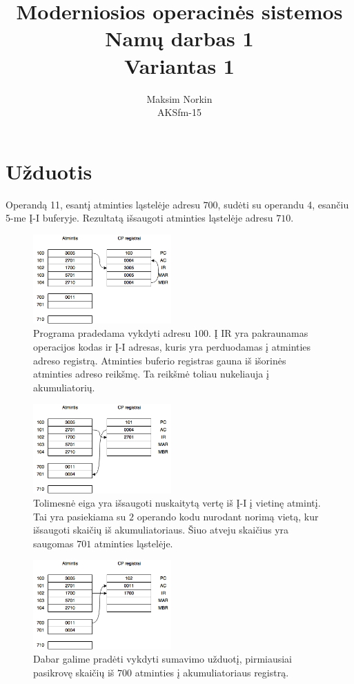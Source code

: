 \documentclass[11pt,a4paper]{article}
\title{Moderniosios operacinės sistemos\\Namų darbas 1\\Variantas 1}
\author{Maksim Norkin\\ AKSfm-15}
\begin{document}
    \maketitle

    \section{Užduotis}

    Operandą 11, esantį atminties ląstelėje adresu $700$, sudėti su operandu 4, esančiu 5-me Į-I buferyje. Rezultatą išsaugoti atminties ląstelėje adresu $710$.

    \begin{figure}[H]
        \centering
        \includegraphics[width=200px]{img/operacines-sistemos-01.png}
        \caption{Programa pradedama vykdyti adresu $100$. Į IR yra pakraunamas operacijos kodas ir Į-I adresas, kuris yra perduodamas į atminties adreso registrą. Atminties buferio registras gauna iš išorinės atminties adreso reikšmę. Ta reikšmė toliau nukeliauja į akumuliatorių.}
    \end{figure}

    \begin{figure}[H]
        \centering
        \includegraphics[width=200px]{img/operacines-sistemos-02.png}
        \caption{Tolimesnė eiga yra išsaugoti nuskaitytą vertę iš Į-I į vietinę atmintį. Tai yra pasiekiama su $2$ operando kodu nurodant norimą vietą, kur išsaugoti skaičių iš akumuliatoriaus. Šiuo atveju skaičius yra saugomas $701$ atminties ląstelėje.}
    \end{figure}

    \begin{figure}[H]
        \centering
        \includegraphics[width=200px]{img/operacines-sistemos-03.png}
        \caption{Dabar galime pradėti vykdyti sumavimo užduotį, pirmiausiai pasikrovę skaičių iš $700$ atminties į akumuliatoriaus registrą.}
    \end{figure}
\end{document}
